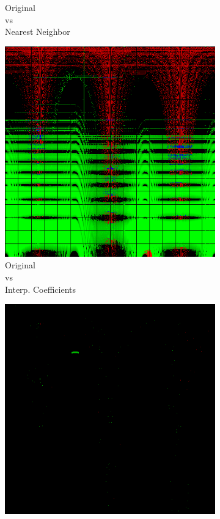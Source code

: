 \begin{figure}[t]
\begin{subfigure}[t]{0.22\textwidth}
		\caption{Original\\vs\\Nearest Neighbor}
		\label{fig:sigDiffOrigNeighbor}
	\end{subfigure} \hspace{0.05em}
	\begin{subfigure}[t]{0.22\textwidth}
	\includegraphics[width=\linewidth]{img/uplifting_diff_originalCoef.png}
	\caption{Original\\vs\\Interp. Coefficients}
	\label{fig:sigDiffSpectraCoeffs}
	\end{subfigure}\hspace{0.05em}
	\begin{subfigure}[t]{0.22\textwidth}
	\includegraphics[width=\linewidth]{img/uplifting_diff_originalSpectra.png}

\end{subfigure}
\end{figure}

